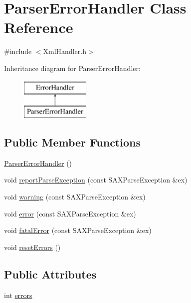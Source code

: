 \hypertarget{class_parser_error_handler}{\section{Parser\+Error\+Handler Class Reference}
\label{class_parser_error_handler}
}


{\ttfamily \#include $<$Xml\+Handler.\+h$>$}

Inheritance diagram for Parser\+Error\+Handler\+:\begin{figure}[H]
\begin{center}
\leavevmode
\includegraphics[height=2.000000cm]{class_parser_error_handler}
\end{center}
\end{figure}
\subsection*{Public Member Functions}
\begin{DoxyCompactItemize}
\item 
\hyperlink{class_parser_error_handler_a9809b43585476fac40b013e6b3f27f1a}{Parser\+Error\+Handler} ()
\item 
void \hyperlink{class_parser_error_handler_a7e9893b8664f42e38cecb483f0d26791}{report\+Parse\+Exception} (const S\+A\+X\+Parse\+Exception \&ex)
\item 
void \hyperlink{class_parser_error_handler_aa63a6f504a4524985be39e0cdfa4e630}{warning} (const S\+A\+X\+Parse\+Exception \&ex)
\item 
void \hyperlink{class_parser_error_handler_aa636e61f4f0fb47f38151e09c3711ee7}{error} (const S\+A\+X\+Parse\+Exception \&ex)
\item 
void \hyperlink{class_parser_error_handler_a95dede361c7ef584c9a732ca716c61a4}{fatal\+Error} (const S\+A\+X\+Parse\+Exception \&ex)
\item 
void \hyperlink{class_parser_error_handler_afcd94fcf4b801a4767a90b88721b432c}{reset\+Errors} ()
\end{DoxyCompactItemize}
\subsection*{Public Attributes}
\begin{DoxyCompactItemize}
\item 
int \hyperlink{class_parser_error_handler_a1929eecf90414ca41886580f1d61248f}{errors}
\end{DoxyCompactItemize}


